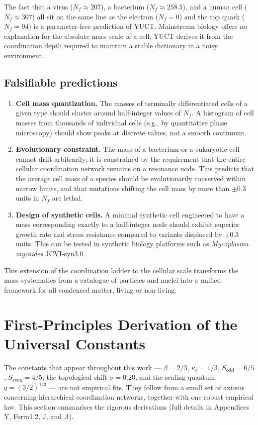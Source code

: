 \documentclass[11pt,a4paper]{article}
\begin{document}
The fact that a virus (\(N_f \approx 207\)), a bacterium (\(N_f \approx 258.5\)), and a human cell (\(N_f \approx 307\)) all sit on the same line as the electron (\(N_f = 0\)) and the top quark (\(N_f = 94\)) is a parameter‑free prediction of YUCT. Mainstream biology offers no explanation for the absolute mass scale of a cell; YUCT derives it from the coordination depth required to maintain a stable dictionary in a noisy environment.

\subsection{Falsifiable predictions}
\begin{enumerate}
	\item \textbf{Cell mass quantization.} The masses of terminally differentiated cells of a given type should cluster around half‑integer values of \(N_f\). A histogram of cell masses from thousands of individual cells (e.g., by quantitative phase microscopy) should show peaks at discrete values, not a smooth continuum.
	\item \textbf{Evolutionary constraint.} The mass of a bacterium or a eukaryotic cell cannot drift arbitrarily; it is constrained by the requirement that the entire cellular coordination network remains on a resonance node. This predicts that the average cell mass of a species should be evolutionarily conserved within narrow limits, and that mutations shifting the cell mass by more than \(\pm 0.3\) units in \(N_f\) are lethal.
	\item \textbf{Design of synthetic cells.} A minimal synthetic cell engineered to have a mass corresponding exactly to a half‑integer node should exhibit superior growth rate and stress resistance compared to variants displaced by \(\pm 0.3\) units. This can be tested in synthetic biology platforms such as \textit{Mycoplasma mycoides} JCVI‑syn3.0.
\end{enumerate}

This extension of the coordination ladder to the cellular scale transforms the mass systematics from a catalogue of particles and nuclei into a unified framework for all condensed matter, living or non‑living.

\section{First‑Principles Derivation of the Universal Constants}
\label{sec:first-principles}

The constants that appear throughout this work — \(\beta = 2/3\), \(\kappa_c = 1/3\), \(S_{\mathrm{odd}}=6/5\), \(S_{\mathrm{even}}=4/5\), the topological shift \(\sigma = 0.20\), and the scaling quantum \(q = (3/2)^{1/3}\) — are not empirical fits. They follow from a small set of axioms concerning hierarchical coordination networks, together with one robust empirical law. This section summarises the rigorous derivations (full details in Appendices Y, Ferra1.2, J, and \(\Lambda\)).
\end{document}
